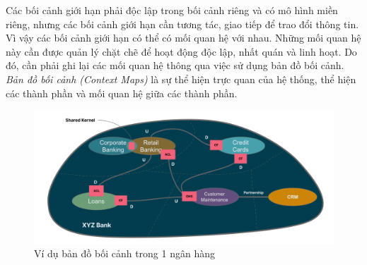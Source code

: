 Các bối cảnh giới hạn phải độc lập trong bối cảnh riêng và có mô hình miền riêng, nhưng các bối cảnh giới hạn cần tương tác, giao tiếp để trao đổi thông tin. Vì vậy các bối cảnh giới hạn có thể có mối quan hệ với nhau. Những mối quan hệ này cần được quản lý chặt chẽ để hoạt động độc lập, nhất quán và linh hoạt. Do đó, cần phải ghi lại các mối quan hệ thông qua việc sử dụng bản đồ bối cảnh. \emph{Bản đồ bối cảnh (Context Maps)} là sự thể hiện trực quan của hệ thống, thể hiện các thành phần và mối quan hệ giữa các thành phần.


\begin{figure}[H]

    \centering
    
    \includegraphics[scale = 0.4]{pictures/ban_do_boi_canh/main.drawio.png}
    
    \caption{Ví dụ bản đồ bối cảnh trong 1 ngân hàng}
    
    \end{figure}
